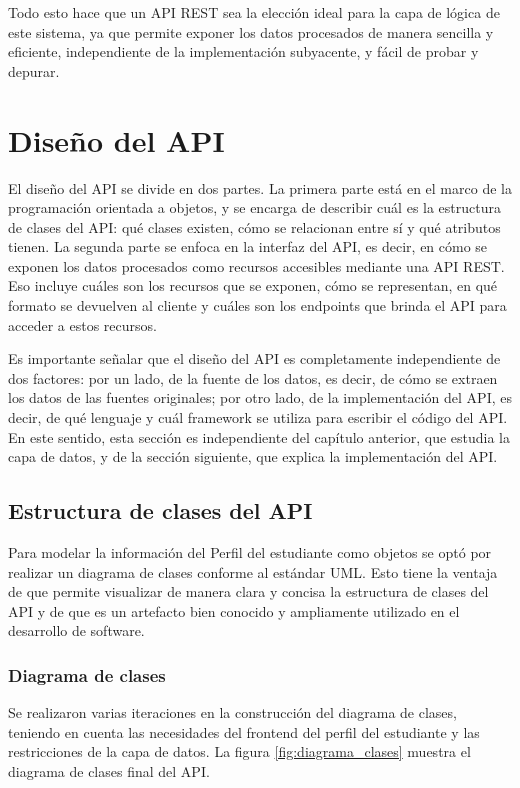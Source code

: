 Todo esto hace que un API REST sea la elección ideal para la capa de lógica de este sistema, ya que permite exponer los datos procesados de manera sencilla y eficiente, independiente de la implementación subyacente, y fácil de probar y depurar.

\section{Diseño del API}

El diseño del API se divide en dos partes. La primera parte está en el marco de la programación orientada a objetos, y se encarga de describir cuál es la estructura de clases del API: qué clases existen, cómo se relacionan entre sí y qué atributos tienen. La segunda parte se enfoca en la interfaz del API, es decir, en cómo se exponen los datos procesados como recursos accesibles mediante una API REST. Eso incluye cuáles son los recursos que se exponen, cómo se representan, en qué formato se devuelven al cliente y cuáles son los endpoints que brinda el API para acceder a estos recursos.

Es importante señalar que el diseño del API es completamente independiente de dos factores: por un lado, de la fuente de los datos, es decir, de cómo se extraen los datos de las fuentes originales; por otro lado, de la implementación del API, es decir, de qué lenguaje y cuál framework se utiliza para escribir el código del API. En este sentido, esta sección es independiente del capítulo anterior, que estudia la capa de datos, y de la sección siguiente, que explica la implementación del API.

\subsection{Estructura de clases del API}

Para modelar la información del Perfil del estudiante como objetos se optó por realizar un diagrama de clases conforme al estándar \gls{UML}. Esto tiene la ventaja de que permite visualizar de manera clara y concisa la estructura de clases del API y de que es un artefacto bien conocido y ampliamente utilizado en el desarrollo de software.

\subsubsection{Diagrama de clases}

Se realizaron varias iteraciones en la construcción del diagrama de clases, teniendo en cuenta las necesidades del frontend del perfil del estudiante y las restricciones de la capa de datos. La figura \ref{fig:diagrama_clases} muestra el diagrama de clases final del API.

